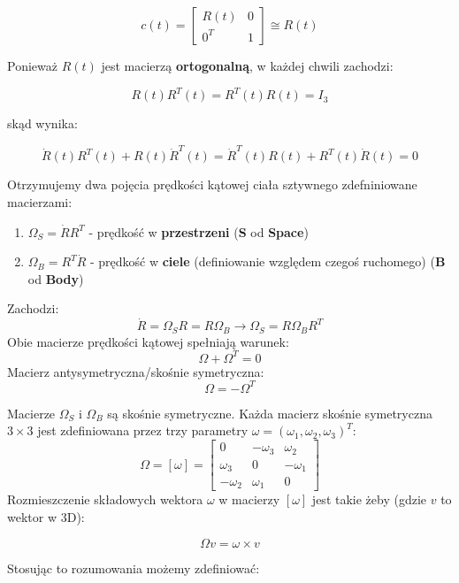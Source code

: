 \documentclass{article}
\begin{document}
\Large
$$
    c\left(t\right)=
    \begin{bmatrix}
        R(t)  & 0 \\[0.3em]
        0^{T} & 1
    \end{bmatrix}
    \cong
    R(t)
$$
\normalsize

Ponieważ $R(t)$ jest macierzą {\bf ortogonalną}, w każdej chwili zachodzi:

$$
    R(t)R^{T}(t)=R^{T}(t)R(t)=I_{3}
$$

skąd wynika:

$$
    \dot R(t)R^{T}(t)+R(t)\dot R^{T}(t)=\dot R^{T}(t)R(t)+R^{T}(t)\dot R(t)=0
$$

Otrzymujemy dwa pojęcia prędkości kątowej ciała sztywnego zdefniniowane macierzami:

\begin{enumerate}
    \item $\Omega_{S}=\dot R R^{T}$ - prędkość w {\bf przestrzeni} ({\bf S} od {\bf Space})
    \item $\Omega_{B}=R^{T} \dot R$ - prędkość w {\bf ciele} (definiowanie względem czegoś ruchomego) ({\bf B} od {\bf Body})
\end{enumerate}


Zachodzi:
\Large
$$
    \dot R =\Omega_{S}R=R\Omega_{B} \rightarrow \Omega_{S}=R\Omega_{B}R^{T}
$$
\normalsize
Obie macierze prędkości kątowej spełniają warunek:
\Large
$$
    \Omega+\Omega^{T}=0
$$
\normalsize
Macierz antysymetryczna/skośnie symetryczna:
\Large
$$
    \Omega = -\Omega^{T}
$$
\normalsize

Macierze $\Omega_{S}$ i $\Omega_{B}$ są skośnie symetryczne. Każda macierz skośnie symetryczna $3\times3$ jest zdefiniowana przez trzy parametry $\omega = \left(\omega_{1}, \omega_{2}, \omega_{3}\right)^{T}$:
\Large
$$
    \Omega=\left[\omega\right]=
    \begin{bmatrix}
        0           & -\omega_{3} & \omega_{2}  \\[0.3em]
        \omega_{3}  & 0           & -\omega_{1} \\[0.3em]
        -\omega_{2} & \omega_{1}  & 0
    \end{bmatrix}
$$
\normalsize
Rozmieszczenie składowych wektora $\omega$ w macierzy $\left[\omega\right]$ jest takie żeby (gdzie $v$ to wektor w 3D):

\Large
$$
    \Omega v = \omega \times v
$$
\normalsize

\newpage

Stosując to rozumowania możemy zdefiniować:
\end{document}
